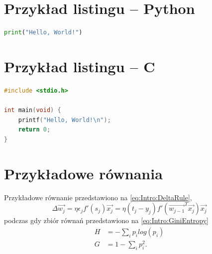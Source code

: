 \documentclass[W2, polski]{ThesisPLodz}
\begin{document}
\section{Przykład listingu -- Python}

\begin{lstlisting}[language=Python, caption={Hello World w Pythonie}, label={lst:python}]
print("Hello, World!")
\end{lstlisting}

\section{Przykład listingu -- C}

\begin{lstlisting}[language=C, caption={Hello World w C}, label={lst:c}]
#include <stdio.h>

int main(void) {
    printf("Hello, World!\n");
    return 0;
}
\end{lstlisting}

\section{Przykładowe równania}
Przykładowe równanie przedstawiono na \eqref{eq:Intro:DeltaRule},
\begin{equation} \label{eq:Intro:DeltaRule}
    \Delta \vec{w_j} = \eta \epsilon_j f'(s_j) \vec{x_j} = \eta (t_j - y_j) f'(\vec{w_{j-1}}^T \vec{x_j}) \vec{x_j}
\end{equation}
podczas gdy zbiór równań przedstawiono na \eqref{eq:Intro:GiniEntropy}
\begin{equation} \label{eq:Intro:GiniEntropy}
    \begin{split}
        H &= - \sum_i p_i log(p_i) \\
        G &= 1 - \sum_i p_i^2.
    \end{split}
\end{equation}


\end{document}

